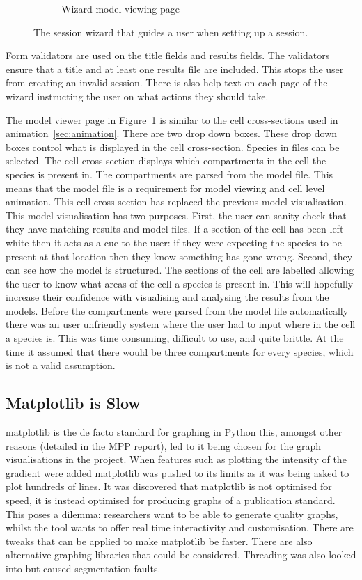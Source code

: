 \begin{figure}[h!]
\begin{subfigure}[b]{0.4\textwidth}
        \caption{Wizard model viewing page}
        \label{fig:page_4}
    \end{subfigure}
    \caption{The session wizard that guides a user when setting up a session.}
    \label{fig:session_wizard}
\end{figure}

Form validators are used on the title fields and results fields.  The validators ensure that a title and at least one results file are included.  This stops the user from creating an invalid session.  There is also help text on each page of the wizard instructing the user on what actions they should take.

The model viewer page in Figure~\ref{fig:page_4} is similar to the cell cross-sections used in animation~\ref{sec:animation}.  There are two drop down boxes.  These drop down boxes control what is displayed in the cell cross-section.  Species in files can be selected.  The cell cross-section displays which compartments in the cell the species is present in.  The compartments are parsed from the model file.  This means that the model file is a requirement for model viewing and cell level animation.  This cell cross-section has replaced the previous model visualisation.  This model visualisation has two purposes. First, the user can sanity check that they have matching results and model files.  If a section of the cell has been left white then it acts as a cue to the user: if they were expecting the species to be present at that location then they know something has gone wrong.  Second, they can see how the model is structured.  The sections of the cell are labelled allowing the user to know what areas of the cell a species is present in.  This will hopefully increase their confidence with visualising and analysing the results from the models. Before the compartments were parsed from the model file automatically there was an user unfriendly system where the user had to input where in the cell a species is.  This was time consuming, difficult to use, and quite brittle.  At the time it assumed that there would be three compartments for every species, which is not a valid assumption.


\subsection{Matplotlib is Slow}

matplotlib is the de facto standard for graphing in Python this, amongst other reasons (detailed in the MPP report), led to it being chosen for the graph visualisations in the project.  When features such as plotting the intensity of the gradient were added matplotlib was pushed to its limits as it was being asked to plot hundreds of lines.  It was discovered that matplotlib is not optimised for speed, it is instead optimised for producing graphs of a publication standard.  This poses a dilemma: researchers want to be able to generate quality graphs, whilst the tool wants to offer real time interactivity and customisation.  There are tweaks that can be applied to make matplotlib be faster. There are also alternative graphing libraries that could be considered.  Threading was also looked into but caused segmentation faults.

